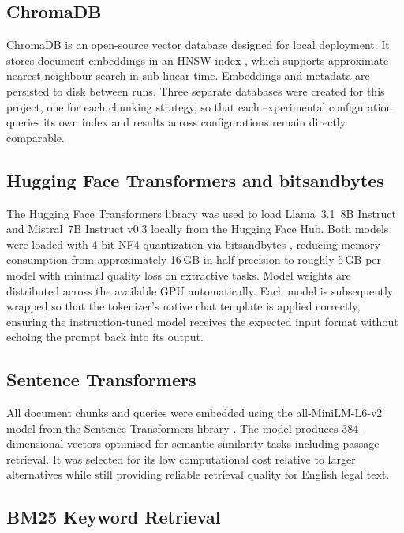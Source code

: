 \subsection{ChromaDB}

ChromaDB \cite{chroma2023} is an open-source vector database designed for local
deployment. It stores document embeddings in an HNSW index \cite{malkov2018hnsw},
which supports approximate nearest-neighbour search in sub-linear time. Embeddings
and metadata are persisted to disk between runs. Three separate databases were
created for this project, one for each chunking strategy, so that each experimental
configuration queries its own index and results across configurations remain
directly comparable.

\subsection{Hugging Face Transformers and bitsandbytes}

The Hugging Face Transformers library \cite{wolf2020transformers} was used to load
Llama~3.1~8B Instruct and Mistral~7B Instruct v0.3 locally from the Hugging Face Hub.
Both models were loaded with 4-bit NF4 quantization via bitsandbytes
\cite{dettmers2023qlora}, reducing memory consumption from approximately 16\,GB in half precision
to roughly 5\,GB per model with minimal quality loss on extractive tasks. Model
weights are distributed across the available GPU automatically. Each model is
subsequently wrapped so that the tokenizer's native chat template is applied
correctly, ensuring the instruction-tuned model receives the expected input format
without echoing the prompt back into its output.


\subsection{Sentence Transformers}

All document chunks and queries were embedded using the all-MiniLM-L6-v2 model from
the Sentence Transformers library \cite{reimers2019sbert}. The model produces
384-dimensional vectors optimised for semantic similarity tasks including passage
retrieval. It was selected for its low computational cost relative to larger
alternatives while still providing reliable retrieval quality for English legal text.

\subsection{BM25 Keyword Retrieval}

